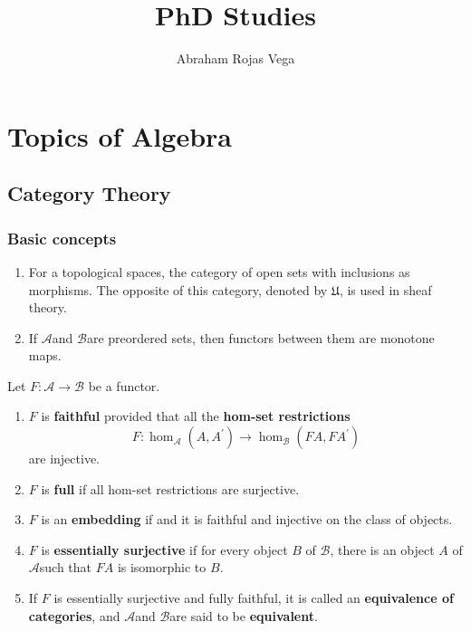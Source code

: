 \documentclass{book}
\title{PhD Studies}
\author{Abraham Rojas Vega}
\newcommand{\ca}{$\mathcal{A}$}
\newcommand{\cb}{$\mathcal{B}$}
\begin{document}
\maketitle

\tableofcontents
\part{Topics of Algebra}


\chapter{Category Theory}

\section*{Basic concepts}

\begin{enumerate}
    \item For a topological spaces, the category of open sets with inclusions as morphisms. The opposite of this category, denoted by $\mathfrak{U}$, is used in sheaf theory.
    \item If \ca and \cb are preordered sets, then functors between them are monotone maps.
\end{enumerate}


\noindent Let $F: \mathcal{A} \rightarrow \mathcal{B}$ be a functor.
\begin{enumerate}
    \item $F$ is \textbf{faithful} provided that all the \textbf{hom-set restrictions}
    $$
    F: \operatorname{hom}_{\mathcal{A}}\left(A, A^{\prime}\right) \rightarrow \operatorname{hom}_{\mathcal{B}}\left(F A, F A^{\prime}\right)
    $$
    are injective.
    \item $F$ is \textbf{full} if all hom-set restrictions are surjective.
    \item $F$ is an \textbf{embedding} if and it is faithful and injective on the class of objects.
    \item $F$ is \textbf{essentially surjective} if for every object $B$ of \cb, there is an object $A$ of \ca such that $F A$ is isomorphic to $B$. 
    \item If $F$ is essentially surjective and fully faithful, it is called an \textbf{equivalence of categories}, and \ca and \cb are said to be \textbf{equivalent}.
\end{enumerate}
\end{document}
